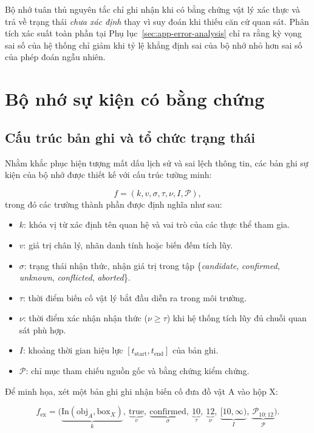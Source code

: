 Bộ nhớ tuân thủ nguyên tắc chỉ ghi nhận khi có bằng chứng vật lý xác thực và trả về trạng thái \textit{chưa xác định} thay vì suy đoán khi thiếu căn cứ quan sát. Phân tích xác suất toàn phần tại Phụ lục~\ref{sec:app-error-analysis} chỉ ra rằng kỳ vọng sai số của hệ thống chỉ giảm khi tỷ lệ khẳng định sai của bộ nhớ nhỏ hơn sai số của phép đoán ngẫu nhiên.

\section{Bộ nhớ sự kiện có bằng chứng}

\subsection{Cấu trúc bản ghi và tổ chức trạng thái}

Nhằm khắc phục hiện tượng mất dấu lịch sử và sai lệch thông tin, các bản ghi sự kiện của bộ nhớ được thiết kế với cấu trúc tường minh:

\begin{equation}
f = (k, v, \sigma, \tau, \nu, I, \mathcal P),
\label{eq:record-tuple}
\end{equation}
trong đó các trường thành phần được định nghĩa như sau:
\begin{itemize}
\item $k$: khóa vị từ xác định tên quan hệ và vai trò của các thực thể tham gia.
\item $v$: giá trị chân lý, nhãn danh tính hoặc biến đếm tích lũy.
\item $\sigma$: trạng thái nhận thức, nhận giá trị trong tập \{\textit{candidate}, \textit{confirmed}, \textit{unknown}, \textit{conflicted}, \textit{aborted}\}.
\item $\tau$: thời điểm biến cố vật lý bắt đầu diễn ra trong môi trường.
\item $\nu$: thời điểm xác nhận nhận thức ($\nu \ge \tau$) khi hệ thống tích lũy đủ chuỗi quan sát phù hợp.
\item $I$: khoảng thời gian hiệu lực $[t_{\mathrm{start}}, t_{\mathrm{end}}]$ của bản ghi.
\item $\mathcal P$: chỉ mục tham chiếu nguồn gốc và bằng chứng kiểm chứng.
\end{itemize}

Để minh họa, xét một bản ghi ghi nhận biến cố đưa đồ vật A vào hộp X:

\begin{equation}
f_{\mathrm{ex}} = \Big(\underbrace{\text{In}(\text{obj}_A, \text{box}_X)}_{k},\ \underbrace{\text{true}}_{v},\ \underbrace{\text{confirmed}}_{\sigma},\ \underbrace{10}_{\tau},\ \underbrace{12}_{\nu},\ \underbrace{[10, \infty)}_{I},\ \underbrace{\mathcal P_{10:12}}_{\mathcal P}\Big).
\label{eq:record-example}
\end{equation}

